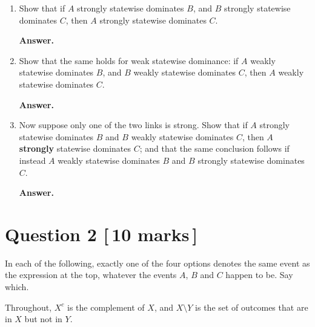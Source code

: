 \documentclass[11pt]{article}
\theoremstyle{definition}
\newenvironment{answer}
  {\par\medskip\noindent\textbf{Answer.}\par\nobreak\smallskip\ignorespaces}
  {\par\medskip}
\begin{document}
\begin{enumerate}[label=(\alph*)]

\item Show that if $A$ strongly statewise dominates $B$, and $B$ strongly
statewise dominates $C$, then $A$ strongly statewise dominates $C$.

\begin{answer}
\end{answer}

\item Show that the same holds for weak statewise dominance: if $A$ weakly
statewise dominates $B$, and $B$ weakly statewise dominates $C$, then $A$ weakly
statewise dominates $C$.

\begin{answer}
\end{answer}

\item Now suppose only one of the two links is strong. Show that if $A$ strongly
statewise dominates $B$ and $B$ weakly statewise dominates $C$, then $A$
\textbf{strongly} statewise dominates $C$; and that the same conclusion follows
if instead $A$ weakly statewise dominates $B$ and $B$ strongly statewise
dominates $C$.

\begin{answer}
\end{answer}

\end{enumerate}

\section*{Question 2 \hfill \normalsize [\,10 marks\,]}

In each of the following, exactly one of the four options denotes the same event
as the expression at the top, whatever the events $A$, $B$ and $C$ happen to be.
Say which.

Throughout, $X^c$ is the complement of $X$, and $X \setminus Y$ is the set of
outcomes that are in $X$ but not in $Y$.
\end{document}
